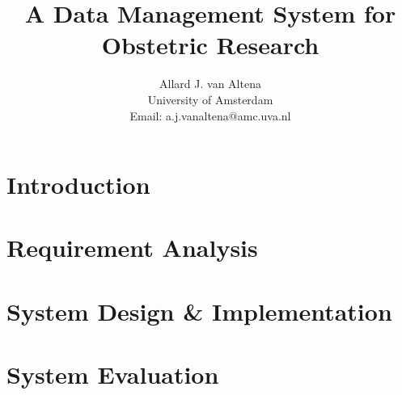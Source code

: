\documentclass[a4paper]{report}
\title{A Data Management System for Obstetric Research}
\author{
	Allard J. van Altena\\
	University of Amsterdam\\
	Email: a.j.vanaltena@amc.uva.nl
}
\newcommand{\project}{IVF-PRN project}
\newcommand{\ivfsystem}{IVF-PRN system}
\begin{document}
	
	\tableofcontents
	
	\chapter{Introduction}
	\label{introduction}

	
	
	
	
	
	\chapter{Requirement Analysis}
	\label{requirements}
	
	
	
	
	
	
	
	
	
	
	
	\chapter{System Design \& Implementation}
	\label{system-functionality}
	
	
	
	
	
	
	
	
	
	\chapter{System Evaluation}
	\label{evaluation}
	
	
	
	
\end{document}
